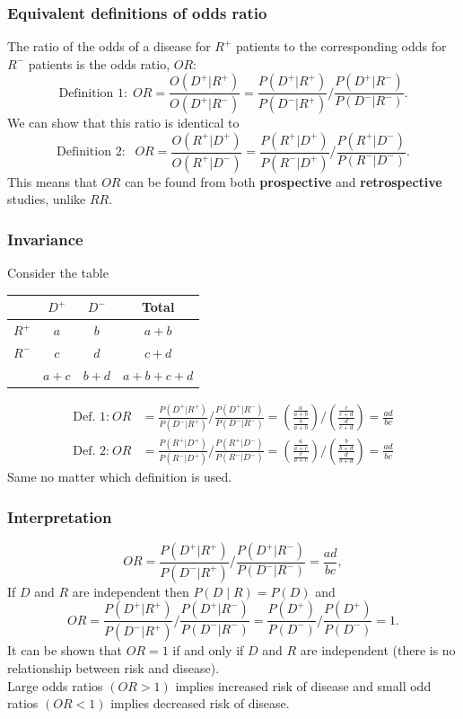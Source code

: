 \documentclass[a4paper]{article}\usepackage[]{graphicx}\usepackage[]{xcolor}
\begin{document}
\subsubsection{Equivalent definitions of odds ratio}
The ratio of the odds of a disease for \( R^+ \) patients to the corresponding odds for \( R^- \) patients is the odds ratio, \( OR \):
\[
	\text{Definition 1:}  \ \  OR = \frac{O(D^+|R^+)}{O(D^+|R^-)} =  \frac{P(D^+|R^+)}{P(D^-|R^+)} \Big/  \frac{P(D^+|R^-)}{P(D^-|R^-)}.
\]
We can show that this ratio is identical to
\[
	\text{Definition 2: }  \ \  OR = \frac{O(R^+|D^+)}{O(R^+|D^-)} = \frac{P(R^+|D^+)}{P(R^-|D^+)} \Big/ \frac{P(R^+|D^-)}{P(R^-|D^-)}.
\]
This means that \( OR \) can be found from both \textbf{prospective} and \textbf{retrospective} studies, unlike \( RR \).
\subsubsection{Invariance}
Consider the table
\begin{table}[H]
	\centering
	\begin{tabular}{@{}cccc@{}}
	\toprule
			  & \( D^+ \) & \( D^- \) & Total         \\ \midrule
	\( R^+ \) & \( a \)   & \( b \)   & \( a+b \)     \\
	\( R^- \) & \( c \)   & \( d \)   & \( c+d \)     \\ \midrule
			  & \( a+c \) & \( b+d \) & \( a+b+c+d \) \\ \bottomrule
	\end{tabular}
\end{table}
\begin{align*}
	\text{Def. 1:}  \  OR &= \frac{P(D^+|R^+)}{P(D^-|R^+)} \Big/  \frac{P(D^+|R^-)}{P(D^-|R^-)} = \left(\frac{\frac{a}{a+b}}{\frac{b}{a+b}}\right) \Big/ \left( \frac{\frac{c}{c+d}}{\frac{d}{c+d}} \right) = \frac{ad}{bc}\\
	\text{Def. 2:}  \  OR &= \frac{P(R^+|D^+)}{P(R^-|D^+)} \Big/ \frac{P(R^+|D^-)}{P(R^-|D^-)} = \left(\frac{\frac{a}{a+c}}{\frac{c}{a+c}}\right) \Big/ \left( \frac{\frac{b}{b+d}}{\frac{d}{b+d}} \right) = \frac{ad}{bc}
\end{align*}
Same no matter which definition is used.
\subsubsection{Interpretation}
\[
	OR = \frac{P(D^+|R^+)}{P(D^-|R^+)} \Big/  \frac{P(D^+|R^-)}{P(D^-|R^-)} = \frac{ad}{bc},
\]
If \( D \) and \( R \) are independent then \( P(D \mid R) = P(D) \) and
\[
	OR = \frac{P(D^+|R^+)}{P(D^-|R^+)} \Big/  \frac{P(D^+|R^-)}{P(D^-|R^-)} = \frac{P(D^+)}{P(D^-)} \Big/  \frac{P(D^+)}{P(D^-)} = 1.
\]
It can be shown that \( OR = 1 \) if and only if \( D \) and \( R \) are independent (there is no relationship between risk and disease).\\
Large odds ratios \( (OR>1) \) implies increased risk of disease and small odd ratios \( (OR < 1) \) implies decreased risk of disease.
\end{document}
